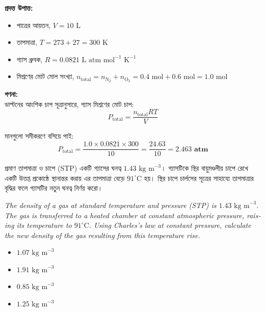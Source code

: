 \documentclass[12pt, a4paper]{article}
\begin{document}
\begin{tcolorbox}[solutionbox={সমাধান (Solution)}]
    \noindent
    \textbf{প্রদত্ত উপাত্ত:}
    \begin{itemize}[leftmargin=1.5em, itemsep=0.2em]
        \item পাত্রের আয়তন, $V = 10\text{ L}$
        \item তাপমাত্রা, $T = 273 + 27 = 300\text{ K}$
        \item গ্যাস ধ্রুবক, $R = 0.0821\text{ L atm mol}^{-1}\text{ K}^{-1}$
        \item মিশ্রণের মোট মোল সংখ্যা, $n_{\text{total}} = n_{\text{N}_2} + n_{\text{O}_2} = 0.4\text{ mol} + 0.6\text{ mol} = 1.0\text{ mol}$
    \end{itemize}

    \vspace{0.6em}
    \noindent\textbf{গণনা:} \\
    ডাল্টনের আংশিক চাপ সূত্রানুসারে, গ্যাস মিশ্রণের মোট চাপ:
    \[ P_{\text{total}} = \frac{n_{\text{total}} R T}{V} \]
    
    মানগুলো সমীকরণে বসিয়ে পাই:
    \[ P_{\text{total}} = \frac{1.0 \times 0.0821 \times 300}{10} = \frac{24.63}{10} = \mathbf{2.463\text{ atm}} \]
\end{tcolorbox}


\begin{tcolorbox}[questionbox={প্রশ্ন (Question) 19}]
    \noindent
    প্রমাণ তাপমাত্রা ও চাপে (STP) একটি গ্যাসের ঘনত্ব $1.43\text{ kg m}^{-3}$। গ্যাসটিকে স্থির বায়ুমণ্ডলীয় চাপে রেখে একটি উত্তপ্ত প্রকোষ্ঠে স্থানান্তর করায় এর তাপমাত্রা বেড়ে $91^\circ\text{C}$ হয়। স্থির চাপে চার্লসের সূত্রের সাহায্যে তাপমাত্রার বৃদ্ধির ফলে গ্যাসটির নতুন ঘনত্ব নির্ণয় করো।
    
    \vspace{0.8em}
    \begin{english}
    \noindent\textit{\color{darkgray}
    The density of a gas at standard temperature and pressure (STP) is $1.43\text{ kg m}^{-3}$. The gas is transferred to a heated chamber at constant atmospheric pressure, raising its temperature to $91^\circ\text{C}$. Using Charles's law at constant pressure, calculate the new density of the gas resulting from this temperature rise.
    }
    \end{english}
\end{tcolorbox}

\begin{itemize}[label={}, leftmargin=1cm, itemsep=0.5em]
    \item[\textbf{A)}] $1.07\text{ kg m}^{-3}$
    \item[\textbf{B)}] $1.91\text{ kg m}^{-3}$
    \item[\textbf{C)}] $0.85\text{ kg m}^{-3}$
    \item[\textbf{D)}] $1.25\text{ kg m}^{-3}$
\end{itemize}
\end{document}
